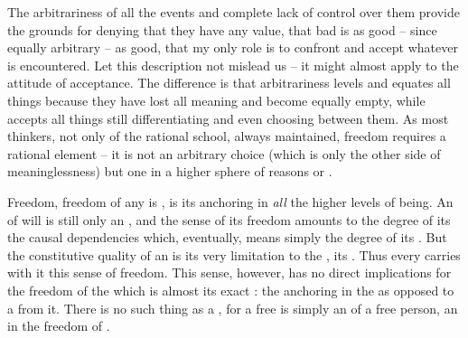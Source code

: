 The arbitrariness of all the events and complete lack of control over them provide 
the grounds for denying that they have any value, that bad is as good -- since
equally arbitrary -- as good, that my only role is to confront and accept
whatever is encountered. Let this description not mislead us -- it might almost
apply to the attitude of  acceptance. The difference is that
arbitrariness levels and equates all things because they have lost all 
meaning and become equally empty, while  accepts all things
still differentiating and even choosing between them. As most thinkers, not only
of the rational school, always
maintained, freedom requires a rational element -- it is not an arbitrary choice
(which is only the other side of meaninglessness) but one  in a higher sphere of reasons or . 

\pa %
Freedom,  freedom of any  is , is its
anchoring in {\em all} the higher levels of being. 
An  of will is still only an
, and the sense of its freedom amounts to the degree of its
  the causal dependencies which, eventually, means
simply the degree of its .
But the constitutive quality of an  is its very limitation to the \hoa,
its .  Thus every  carries with it this sense of
freedom. This sense, however, has no direct implications for the freedom of the
 which is almost its exact : the  anchoring
in the  as opposed to a  from it.
%
There is no such thing as a , for a free 
is simply an  of a free person, an   in
the freedom of .

